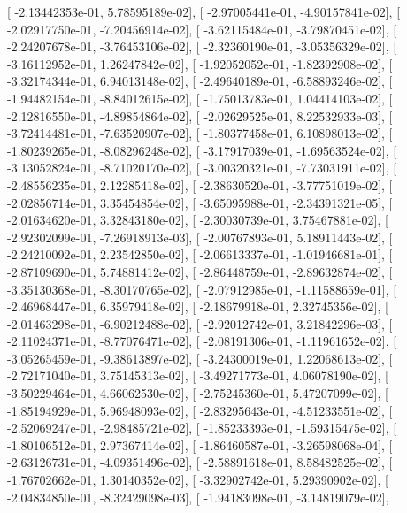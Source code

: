\documentclass{article}
\begin{document}
       [ -2.13442353e-01,   5.78595189e-02],
       [ -2.97005441e-01,  -4.90157841e-02],
       [ -2.02917750e-01,  -7.20456914e-02],
       [ -3.62115484e-01,  -3.79870451e-02],
       [ -2.24207678e-01,  -3.76453106e-02],
       [ -2.32360190e-01,  -3.05356329e-02],
       [ -3.16112952e-01,   1.26247842e-02],
       [ -1.92052052e-01,  -1.82392908e-02],
       [ -3.32174344e-01,   6.94013148e-02],
       [ -2.49640189e-01,  -6.58893246e-02],
       [ -1.94482154e-01,  -8.84012615e-02],
       [ -1.75013783e-01,   1.04414103e-02],
       [ -2.12816550e-01,  -4.89854864e-02],
       [ -2.02629525e-01,   8.22532933e-03],
       [ -3.72414481e-01,  -7.63520907e-02],
       [ -1.80377458e-01,   6.10898013e-02],
       [ -1.80239265e-01,  -8.08296248e-02],
       [ -3.17917039e-01,  -1.69563524e-02],
       [ -3.13052824e-01,  -8.71020170e-02],
       [ -3.00320321e-01,  -7.73031911e-02],
       [ -2.48556235e-01,   2.12285418e-02],
       [ -2.38630520e-01,  -3.77751019e-02],
       [ -2.02856714e-01,   3.35454854e-02],
       [ -3.65095988e-01,  -2.34391321e-05],
       [ -2.01634620e-01,   3.32843180e-02],
       [ -2.30030739e-01,   3.75467881e-02],
       [ -2.92302099e-01,  -7.26918913e-03],
       [ -2.00767893e-01,   5.18911443e-02],
       [ -2.24210092e-01,   2.23542850e-02],
       [ -2.06613337e-01,  -1.01946681e-01],
       [ -2.87109690e-01,   5.74881412e-02],
       [ -2.86448759e-01,  -2.89632874e-02],
       [ -3.35130368e-01,  -8.30170765e-02],
       [ -2.07912985e-01,  -1.11588659e-01],
       [ -2.46968447e-01,   6.35979418e-02],
       [ -2.18679918e-01,   2.32745356e-02],
       [ -2.01463298e-01,  -6.90212488e-02],
       [ -2.92012742e-01,   3.21842296e-03],
       [ -2.11024371e-01,  -8.77076471e-02],
       [ -2.08191306e-01,  -1.11961652e-02],
       [ -3.05265459e-01,  -9.38613897e-02],
       [ -3.24300019e-01,   1.22068613e-02],
       [ -2.72171040e-01,   3.75145313e-02],
       [ -3.49271773e-01,   4.06078190e-02],
       [ -3.50229464e-01,   4.66062530e-02],
       [ -2.75245360e-01,   5.47207099e-02],
       [ -1.85194929e-01,   5.96948093e-02],
       [ -2.83295643e-01,  -4.51233551e-02],
       [ -2.52069247e-01,  -2.98485721e-02],
       [ -1.85233393e-01,  -1.59315475e-02],
       [ -1.80106512e-01,   2.97367414e-02],
       [ -1.86460587e-01,  -3.26598068e-04],
       [ -2.63126731e-01,  -4.09351496e-02],
       [ -2.58891618e-01,   8.58482525e-02],
       [ -1.76702662e-01,   1.30140352e-02],
       [ -3.32902742e-01,   5.29390902e-02],
       [ -2.04834850e-01,  -8.32429098e-03],
       [ -1.94183098e-01,  -3.14819079e-02],
\end{document}
